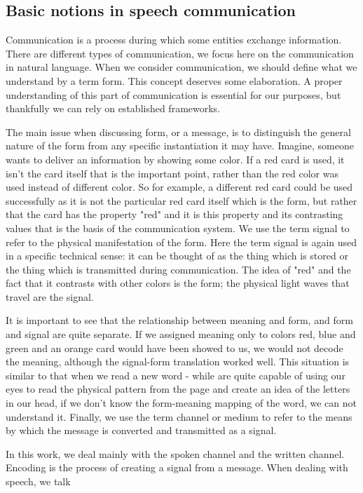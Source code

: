 \subsection{Basic notions in speech communication}
Communication is a process during which some entities exchange information.
There are different types of communication, we focus here on the communication in natural language.
When we consider communication, we should define what we understand by a term form.
This concept deserves some elaboration.
A proper understanding of this part of communication is essential for our purposes, but thankfully we can rely on established frameworks.
\par
The main issue when discussing form, or a message, is to distinguish the general nature of the form from
any specific instantiation it may have.
Imagine, someone wants to deliver an information by showing some color.
If a red card is used, it isn't the card itself that is the important point, rather than the red color was used instead of different color.
So for example, a different red card could be used successfully  as it
is not the particular red card itself which is the form, but rather that the card has the property "red"
and it is this property and its contrasting values that is the basis of the communication system.
We use the term signal to refer to the physical manifestation of the form.
Here the term signal is again used in a specific technical sense: it can be thought of as the thing which is stored or the
thing which is transmitted during communication.
The idea of "red" and the fact that it contrasts with other colors is the form; the physical light waves that travel are the signal.
\par
It is important to see that the relationship between meaning and form, and form and signal
are quite separate.
If we assigned meaning only to colors red, blue and green and an orange card would have been showed to us, we would not decode the meaning, although the signal-form translation worked well.
This situation is similar to that when we read a new word - while are quite capable of using our eyes to read the physical pattern from the page and create an idea of the letters in our head, if we don't know the form-meaning mapping of the word, we can not understand it.
Finally, we use the term channel or medium to refer to the means by which the message
is converted and transmitted as a signal.
\par
In this work, we deal mainly with the spoken channel and the written channel.
Encoding is the process of creating a signal from a message. When dealing with speech, we talk
